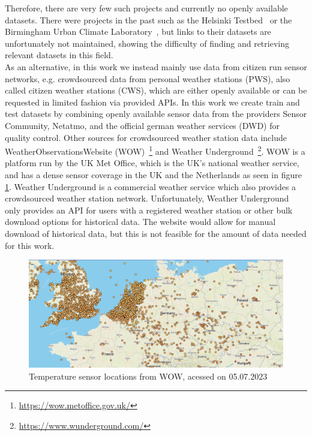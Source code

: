 Therefore, there are very few such projects and currently no openly available datasets. There were projects in the past such as the Helsinki Testbed~\cite{koskinen2011helsinki} or the Birmingham Urban Climate Laboratory~\cite{warren2016birmingham}, but links to their datasets are unfortunately not maintained, showing the difficulty of finding and retrieving relevant datasets in this field.\\
As an alternative, in this work we instead mainly use data from citizen run sensor networks, e.g. crowdsourced data from personal weather stations (PWS), also called citizen weather stations (CWS), which are either openly available or can be requested in limited fashion via provided APIs. In this work we create train and test datasets by combining openly available sensor data from the providers Sensor Community, Netatmo, and the official german weather services (DWD) for quality control. Other sources for crowdsourced weather station data include WeatherObservationsWebsite (WOW)~\footnote{\url{https://wow.metoffice.gov.uk/}} and Weather Underground~\footnote{\url{https://www.wunderground.com/}}. WOW is a platform run by the UK Met Office, which is the UK's national weather service, and has a dense sensor coverage in the UK and the Netherlands as seen in figure \ref{fig:wow sensor locations}. Weather Underground is a commercial weather service which also provides a crowdsourced weather station network. Unfortunately, Weather Underground only provides an API for users with a registered weather station or other bulk download options for historical data. The website would allow for manual download of historical data, but this is not feasible for the amount of data needed for this work.

\begin{figure}[ht]
    \centering
    \includegraphics[width=1\textwidth]{images/wow_sensor_locations.png}
    \caption{Temperature sensor locations from WOW, acessed on 05.07.2023}
    \label{fig:wow sensor locations}
\end{figure}


